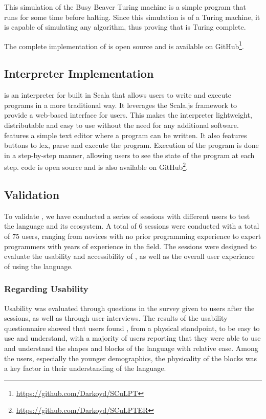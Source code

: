 \normalsize
This simulation of the Busy Beaver Turing machine is a simple program that runs for some time before halting.
Since this simulation is of a Turing machine, it is capable of simulating any algorithm, thus proving that \sculpt is Turing complete.

The complete implementation of \sculpt is open source and is available on GitHub\footnote{\url{https://github.com/Darkoyd/SCuLPT}}.

\subsection{Interpreter Implementation}
\label{sec:results:interpreter}
\sculpter is an interpreter for \sculpt built in Scala that allows users to write and execute \sculpt programs in a more traditional way.
It leverages the Scala.js framework to provide a web-based interface for users.
This makes the interpreter lightweight, distributable and easy to use without the need for any additional software.
\sculpter features a simple text editor where a program can be written. It also features buttons to lex, parse and execute the program.
Execution of the program is done in a step-by-step manner, allowing users to see the state of the program at each step.
\sculpter code is open source and is also available on GitHub\footnote{\url{https://github.com/Darkoyd/SCuLPTER}}.


\subsection{Validation}
\label{sec:results:validation}
To validate \sculpt, we have conducted a series of sessions with different users to test the language and its ecosystem.
A total of 6 sessions were conducted with a total of 75 users, ranging from novices with no prior programming experience to expert programmers with years of experience in the field.
The sessions were designed to evaluate the usability and accessibility of \sculpt, as well as the overall user experience of using the language.

\subsubsection{Regarding Usability}
\label{sec:results:validation:usability}
Usability was evaluated through questions in the survey given to users after the sessions, as well as through user interviews.
The results of the usability questionnaire showed that users found \sculpt, from a physical standpoint, to be easy to use and understand, 
with a majority of users reporting that they were able to use and understand the shapes and blocks of the language with relative ease.
Among the users, especially the younger demographics, the physicality of the blocks was a key factor in their understanding of the language.

